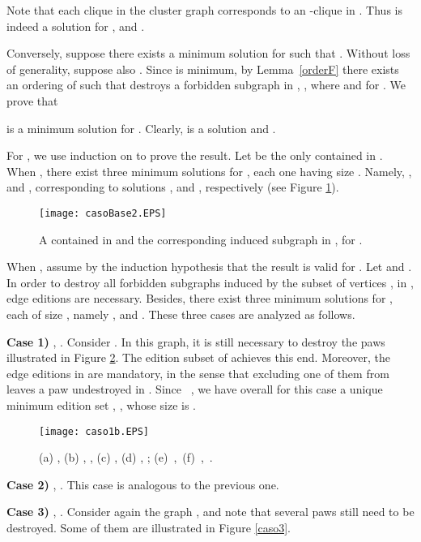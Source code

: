 \documentclass[12pt]{article}
\begin{document}
Note that each clique in the cluster graph  corresponds to an -clique in . Thus  is indeed a solution for , and .

Conversely, suppose there exists a minimum solution  for  such that . Without loss of generality, suppose also . Since  is minimum, by Lemma~\ref{orderF} there exists an ordering  of  such that  destroys a forbidden subgraph in , , where  and  for . We prove that



is a minimum solution for . Clearly,  is a solution and .

For , we use induction on  to prove the result. Let  be the only  contained in . When , there exist three minimum solutions  for , each one having size . Namely, ,   and , corresponding to solutions ,  and , respectively (see Figure \ref{casobase}).

\begin{figure}[htb]
\centering
\texttt{[image: casoBase2.EPS]}
\caption{\label{casobase} A  contained in  and the corresponding induced subgraph in , for .}
\end{figure}

When , assume by the induction hypothesis that the result is valid for . Let  and . In order to destroy all forbidden subgraphs induced by the subset of vertices ,  in ,  edge editions are necessary. Besides, there exist three minimum solutions  for , each of size , namely ,  and . These three cases are analyzed as follows.


\noindent
\textbf{Case 1)} , . Consider . In this graph, it is still necessary to destroy the paws illustrated in Figure \ref{caso1}. The edition subset  of  achieves this end. Moreover, the edge editions in  are mandatory, in the sense that excluding one of them from  leaves a paw undestroyed in . Since \  , we have overall for this case a unique minimum edition set , , whose size is .

\begin{figure}[htb]
\centering
\texttt{[image: caso1b.EPS]}
\caption{\label{caso1}(a) ,  (b) , ,  (c) ,  (d) , ;  \mbox{(e) ,  (f) , }.}
\end{figure}

\noindent
\textbf{Case 2)} , . This case is analogous to the previous one.

\noindent
\textbf{Case 3)} , . Consider again the graph , and note that several paws still need to be destroyed. Some of them are illustrated in Figure \ref{caso3}.
\end{document}
